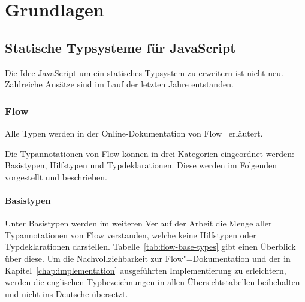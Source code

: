 \chapter{Grundlagen}
\label{chap:basics}

\section{Statische Typsysteme für JavaScript}

Die Idee JavaScript um ein statisches Typsystem zu erweitern ist nicht neu. Zahlreiche Ansätze sind im Lauf der letzten Jahre entstanden.


\subsection{Flow}
\label{subsection:flow}

Alle Typen werden in der Online-Dokumentation von Flow~\autocite{FLOW:TYPE_ANNOTATIONS} erläutert.

Die Typannotationen von Flow können in drei Kategorien eingeordnet werden: Basistypen, Hilfstypen und Typdeklarationen. Diese werden im Folgenden vorgestellt und beschrieben.

\subsubsection{Basistypen}

Unter Basistypen werden im weiteren Verlauf der Arbeit die Menge aller Typannotationen von Flow verstanden, welche keine Hilfstypen oder Typdeklarationen darstellen. Tabelle~\ref{tab:flow-base-types} gibt einen Überblick über diese. Um die Nachvollziehbarkeit zur Flow"=Dokumentation und der in Kapitel~\ref{chap:implementation} ausgeführten Implementierung zu erleichtern, werden die englischen Typbezeichnungen in allen Übersichtstabellen beibehalten und nicht ins Deutsche übersetzt.

